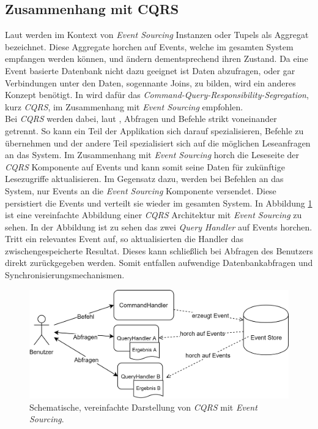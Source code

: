 \subsection{Zusammenhang mit CQRS}
Laut \cite{vernon2013implementing} werden im Kontext von \textit{Event Sourcing} Instanzen oder Tupels als Aggregat bezeichnet. Diese Aggregate horchen auf  Events, welche im gesamten System empfangen werden können, und ändern dementsprechend ihren Zustand. Da eine Event basierte Datenbank nicht dazu geeignet ist Daten abzufragen, oder gar Verbindungen unter den Daten, sogennante Joins, zu bilden, wird ein anderes Konzept benötigt. In \cite{vernon2013implementing} wird dafür das \textit{Command-Query-Responsibility-Segregation}, kurz \textit{CQRS}, im Zusammenhang mit \textit{Event Sourcing} empfohlen. \\
Bei \textit{CQRS} werden dabei, laut \cite{cqrsYoung2010}, Abfragen und  Befehle strikt voneinander getrennt. So kann ein Teil der Applikation sich darauf spezialisieren, Befehle zu übernehmen und der andere Teil spezialisiert sich auf die möglichen Leseanfragen an das System. Im Zusammenhang mit \textit{Event Sourcing} horch die Leseseite der \textit{CQRS} Komponente auf Events und kann somit seine Daten für zukünftige Lesezugriffe aktualisieren. Im Gegensatz dazu, werden bei Befehlen an das System, nur Events an die \textit{Event Sourcing} Komponente versendet. Diese persistiert die Events und verteilt sie wieder im gesamten System. In Abbildung \ref{fig:transactionTheory:eventSourcing:cqrs} ist eine vereinfachte Abbildung einer \textit{CQRS} Architektur mit \textit{Event Sourcing} zu sehen. In der Abbildung ist zu sehen das zwei \textit{Query Handler} auf Events horchen. Tritt ein relevantes Event auf, so aktualisierten die Handler das zwischengespeicherte Resultat. Dieses kann schließlich bei Abfragen des Benutzers direkt zurückgegeben werden. Somit entfallen aufwendige Datenbankabfragen und Synchronisierungsmechanismen. \\
\begin{figure}
    \centering
    \includegraphics[width=\linewidth]{gfx/other/eventSourcingCqrs}
    \caption{Schematische, vereinfachte Darstellung von \textit{CQRS} mit \textit{Event Sourcing}.}
    \label{fig:transactionTheory:eventSourcing:cqrs}
\end{figure}
